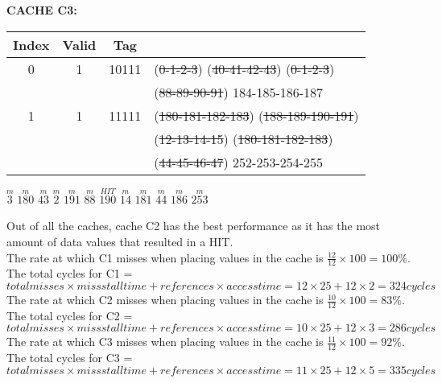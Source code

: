 \documentclass[12pt]{article}
\begin{document}
	\noindent \textbf{CACHE C3:}  \\
	

		\begin{tabular}{ |c|c|c|l| } 
			\hline
			Index & Valid & Tag &  \\
			\hline
			0 & 1 & 10111 & (\sout{0-1-2-3}) (\sout{40-41-42-43}) (\sout{0-1-2-3}) \\ & & & (\sout{88-89-90-91}) 184-185-186-187 \\
			\hline
			1 & 1 & 11111 & (\sout{180-181-182-183})  (\sout{188-189-190-191})\\ & & &  (\sout{12-13-14-15}) (\sout{180-181-182-183}) \\ & & & (\sout{44-45-46-47}) 252-253-254-255 \\
			\hline
			
		\end{tabular}
		
	\begin{center}
		$\overset{m}{3}$ $\overset{m}{180}$ $\overset{m}{43}$ $\overset{m}{2}$ $\overset{m}{191}$ $\overset{m}{88}$ $\overset{HIT}{190}$ $\overset{m}{14}$ $\overset{m}{181}$ $\overset{m}{44}$ $\overset{m}{186}$ $\overset{m}{253}$  \vspace{0.5cm} \\
	\end{center}
	
	\noindent Out of all the caches, cache C2 has the best performance as it has the most amount of data values that resulted in a HIT.  \vspace{0.3cm} \\
	
	
		
	\noindent The rate at which C1 misses when placing values in the cache is $\frac{12}{12} \times 100 = 100\%$. The total cycles for C1 = $total misses \times miss stall time + references \times access time = 12 \times 25 + 12 \times 2 = 324 cycles$  \\
	
	\noindent The rate at which C2 misses when placing values in the cache is $\frac{10}{12} \times 100 = 83\%$. The total cycles for C2 = $total misses \times miss stall time + references \times access time = 10 \times 25 + 12 \times 3 = 286 cycles$  \\
	
	\noindent The rate at which C3 misses when placing values in the cache is $\frac{11}{12} \times 100 = 92\%$. The total cycles for C3 = $total misses \times miss stall time + references \times access time = 11 \times 25 + 12 \times 5 = 335 cycles$  \\
	
\end{document}
